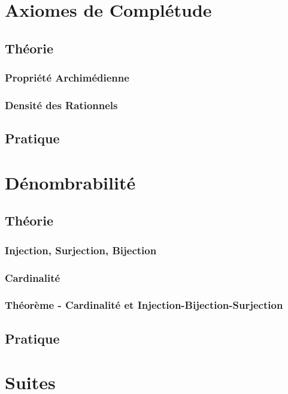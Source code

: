\documentclass{article}
\begin{document}
\section{Axiomes de Complétude}

\subsection{Théorie}

\subsubsection{Propriété Archimédienne}

\subsubsection{Densité des Rationnels}

\subsection{Pratique}

\section{Dénombrabilité}

\subsection{Théorie}

\subsubsection{Injection, Surjection, Bijection}

\subsubsection{Cardinalité}

\subsubsection{Théorème - Cardinalité et Injection-Bijection-Surjection}

\subsection{Pratique}

\section{Suites}
\end{document}
